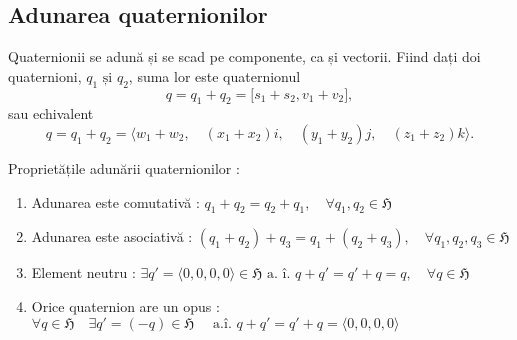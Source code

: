 \subsection{Adunarea quaternionilor}
\label{ch1:sec_quaternions:sub_add}
Quaternionii se adună și se scad pe componente, ca și vectorii.
Fiind dați doi quaternioni, $q_1 \text{ și } q_2$, suma lor este quaternionul
\begin{equation}
q = q_1 + q_2 = \lbrack s_1 + s_2, v_1 + v_2 \rbrack,
\end{equation} sau echivalent
\begin{equation}
q = q_1 + q_2 = \langle w_1 + w_2, \quad (x_1 + x_2)i, \quad (y_1 + y_2)j, 
\quad (z_1 + z_2)k \rangle.
\end{equation}

\noindent

Proprietățile adunării quaternionilor :
\begin{enumerate}
    \item Adunarea este comutativă : 
    $q_1 + q_2 = q_2 + q_1, \quad \forall q_1, q_2 \in \mathfrak{H}$
    \item Adunarea este asociativă :
    $(q_1 + q_2) + q_3 = q_1 + (q_2 + q_3), \quad \forall q_1, q_2, q_3
    \in \mathfrak{H}$
    \item Element neutru : $\exists q' = \langle 0, 0, 0, 0 \rangle \in 
    \mathfrak{H} \text{ a. î. } q + q' = q' + q = q, \quad \forall q \in
    \mathfrak{H}$ 
    \item Orice quaternion are un opus : $\forall q \in \mathfrak{H} \quad
    \exists q' = (-q) \in \mathfrak{H} \quad \text{ a.î. } q + q' = q' + q = 
    \langle 0, 0, 0, 0 \rangle$
\end{enumerate}

